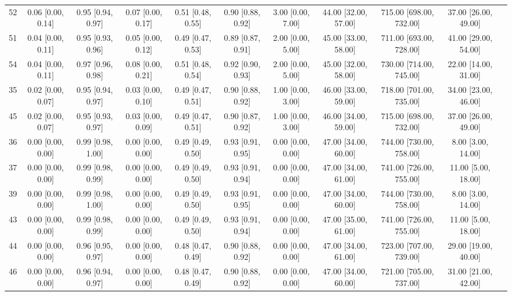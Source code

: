 \documentclass[8pt]{article}
\begin{document}
\begin{center}
\begin{footnotesize}
\begin{longtable}{|ccccccccccc|}
 52 &  0.06 [0.00, 0.14] &  0.95 [0.94, 0.97] &  0.07 [0.00, 0.17] &  0.51 [0.48, 0.55] &  0.90 [0.88, 0.92] &     3.00 [0.00, 7.00] &  44.00 [32.00, 57.00] &  715.00 [698.00, 732.00] &     37.00 [26.00, 49.00] \\
 51 &  0.04 [0.00, 0.11] &  0.95 [0.93, 0.96] &  0.05 [0.00, 0.12] &  0.49 [0.47, 0.53] &  0.89 [0.87, 0.91] &     2.00 [0.00, 5.00] &  45.00 [33.00, 58.00] &  711.00 [693.00, 728.00] &     41.00 [29.00, 54.00] \\
 54 &  0.04 [0.00, 0.11] &  0.97 [0.96, 0.98] &  0.08 [0.00, 0.21] &  0.51 [0.48, 0.54] &  0.92 [0.90, 0.93] &     2.00 [0.00, 5.00] &  45.00 [32.00, 58.00] &  730.00 [714.00, 745.00] &     22.00 [14.00, 31.00] \\
 35 &  0.02 [0.00, 0.07] &  0.95 [0.94, 0.97] &  0.03 [0.00, 0.10] &  0.49 [0.47, 0.51] &  0.90 [0.88, 0.92] &     1.00 [0.00, 3.00] &  46.00 [33.00, 59.00] &  718.00 [701.00, 735.00] &     34.00 [23.00, 46.00] \\
 45 &  0.02 [0.00, 0.07] &  0.95 [0.93, 0.97] &  0.03 [0.00, 0.09] &  0.49 [0.47, 0.51] &  0.90 [0.87, 0.92] &     1.00 [0.00, 3.00] &  46.00 [34.00, 59.00] &  715.00 [698.00, 732.00] &     37.00 [26.00, 49.00] \\
 36 &  0.00 [0.00, 0.00] &  0.99 [0.98, 1.00] &  0.00 [0.00, 0.00] &  0.49 [0.49, 0.50] &  0.93 [0.91, 0.95] &     0.00 [0.00, 0.00] &  47.00 [34.00, 60.00] &  744.00 [730.00, 758.00] &       8.00 [3.00, 14.00] \\
 37 &  0.00 [0.00, 0.00] &  0.99 [0.98, 0.99] &  0.00 [0.00, 0.00] &  0.49 [0.49, 0.50] &  0.93 [0.91, 0.94] &     0.00 [0.00, 0.00] &  47.00 [34.00, 61.00] &  741.00 [726.00, 755.00] &      11.00 [5.00, 18.00] \\
 39 &  0.00 [0.00, 0.00] &  0.99 [0.98, 1.00] &  0.00 [0.00, 0.00] &  0.49 [0.49, 0.50] &  0.93 [0.91, 0.95] &     0.00 [0.00, 0.00] &  47.00 [34.00, 60.00] &  744.00 [730.00, 758.00] &       8.00 [3.00, 14.00] \\
 43 &  0.00 [0.00, 0.00] &  0.99 [0.98, 0.99] &  0.00 [0.00, 0.00] &  0.49 [0.49, 0.50] &  0.93 [0.91, 0.94] &     0.00 [0.00, 0.00] &  47.00 [35.00, 61.00] &  741.00 [726.00, 755.00] &      11.00 [5.00, 18.00] \\
 44 &  0.00 [0.00, 0.00] &  0.96 [0.95, 0.97] &  0.00 [0.00, 0.00] &  0.48 [0.47, 0.49] &  0.90 [0.88, 0.92] &     0.00 [0.00, 0.00] &  47.00 [34.00, 61.00] &  723.00 [707.00, 739.00] &     29.00 [19.00, 40.00] \\
 46 &  0.00 [0.00, 0.00] &  0.96 [0.94, 0.97] &  0.00 [0.00, 0.00] &  0.48 [0.47, 0.49] &  0.90 [0.88, 0.92] &     0.00 [0.00, 0.00] &  47.00 [34.00, 60.00] &  721.00 [705.00, 737.00] &     31.00 [21.00, 42.00] \\

\end{longtable}
\end{footnotesize}
\end{center}
\end{document}
